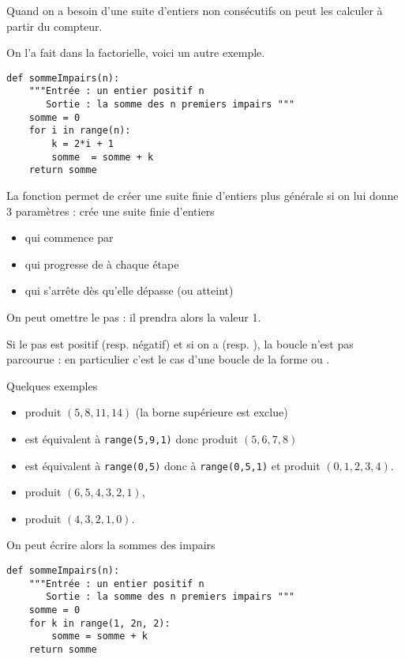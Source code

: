 Quand on a besoin d'une suite d'entiers non consécutifs on peut les calculer à partir du compteur. 

On l'a fait dans la factorielle, voici un autre exemple.
\begin{lstlisting}
def sommeImpairs(n):
    """Entrée : un entier positif n
       Sortie : la somme des n premiers impairs """
    somme = 0
    for i in range(n):
        k = 2*i + 1
        somme  = somme + k
    return somme 
\end{lstlisting}

La fonction  permet de créer une suite finie d'entiers plus générale si on lui donne 3 paramètres : 
 crée une suite finie d'entiers
\begin{itemize}
\item qui commence par  
\item qui progresse de  à chaque étape 
\item qui s'arrête dès qu'elle dépasse (ou atteint) 
\end{itemize}
On peut omettre le pas : il prendra alors la valeur 1.

Si le pas est positif (resp. négatif) et si on a  (resp. ), la boucle n'est pas parcourue : en particulier c'est le cas d'une boucle de la forme  ou .

Quelques exemples
\begin{itemize}
\item {} produit $(5,8,11,14)$ (la borne supérieure est exclue)
\item {} est équivalent à {\tt range(5,9,1)} donc produit $(5,6,7,8)$
\item {} est équivalent à {\tt range(0,5)} donc à  {\tt range(0,5,1)} et produit $(0,1,2,3,4)$.
\item {} produit $(6,5,4,3,2,1)$,
\item {} produit $(4,3,2,1,0)$.
\end{itemize}
On peut écrire alors la sommes des impairs
\begin{lstlisting}
def sommeImpairs(n):
    """Entrée : un entier positif n
       Sortie : la somme des n premiers impairs """
    somme = 0
    for k in range(1, 2n, 2):
        somme = somme + k
    return somme
\end{lstlisting}
\newpage
